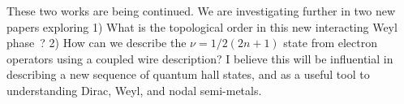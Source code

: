 These two works are being continued. We are investigating further in two new papers exploring
1) What is the topological order in this new interacting Weyl phase~\cite{SirotaRazaTeoappearsoon}?
2) How can we describe the $\nu=1/2(2n+1)$ state from electron operators using a coupled wire description?
I believe this will be influential in describing a new sequence of quantum hall states, and as a useful tool to understanding Dirac, Weyl, and nodal semi-metals.